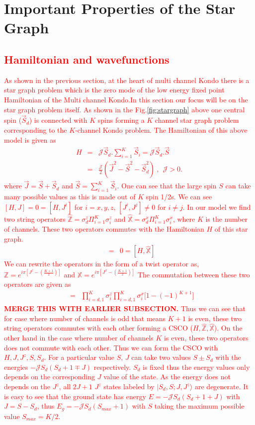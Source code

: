 \documentclass[reprint,prb,superscriptaddress]{revtex4-2}
\begin{document}
\section{Important Properties of the Star Graph}
\textcolor{red}{\subsection{Hamiltonian and wavefunctions}
\noindent As shown in the previous section, at the heart of multi channel Kondo there is a star graph problem which is the zero mode of the low energy fixed point Hamiltonian of the Multi channel Kondo.In this section our focus will be on the star graph problem itself.
As shown in the Fig.\ref{fig:stargraph} above one central spin ($\vec{S}_d$) is connected with $K$ spins forming a $K$ channel star graph problem corresponding to the $K$-channel Kondo problem. The Hamiltonian of this above model is given as 
\begin{eqnarray}
H &=& {\mathcal{J}} \vec{S}_d.\sum_{i=1}^{K}\vec{S}_i={\mathcal{J}} \vec{S}_d.\vec{S} \nonumber\\
&=& \frac{{\mathcal{J}}}{2} (\vec{J}^2-\vec{S}^2-\vec{S}_d^2)~,~~{\mathcal{J}} >0.
\label{eq:stargraph_hamiltonian}
\end{eqnarray}
where $\vec{J}=\vec{S}+\vec{S}_d$ and $\vec{S}=\sum_{i=1}^{K} \vec{S}_i$. One can see that the large spin $S$ can take many possible values as this is made out of $K$ spin 1/2s. We can see $[H,J]=0=[H,J^i]$ for  $i=x,y,z$, $[J^i,J^j]\neq 0$ for $i\neq j$. In our model we find two string operators $\hat{\mathbb{Z}}=\sigma_d^z\Pi_{i=1}^{K} \sigma_i^z$ and $\hat{\mathbb{X}}=\sigma_d^x\Pi_{i=1}^{K} \sigma_i^x$, where $K$ is the number of channels. These two operators commutes with the Hamiltonian $H$ of this star graph.
\begin{eqnarray}
[H,\hat{\mathbb{Z}}] &=& 0 = [H,\hat{\mathbb{X}}]
\end{eqnarray}
We can rewrite the operators in the form of a twist operator as, $\mathbb{Z}=e^{i\pi [J^z-(\frac{K+1}{2})]}$ and $\mathbb{X}=e^{i\pi [J^x-(\frac{K+1}{2})]}$
The commutation between these two operators are given as
\begin{eqnarray}
[\mathbb{Z},\mathbb{X}] &=& \prod_{i=d,1}^{K} \sigma^z_{i} \prod_{i=d,1}^{K} \sigma^x_{i} \bigg[1-(-1)^{K+1}\bigg]
\end{eqnarray}
\textbf{MERGE THIS WITH EARLIER SUBSECTION.}
Thus we can see that for case where number of channels is odd that means $K+1$ is even, these two string operators commutes with each other forming a CSCO ($H,\hat{\mathbb{Z}},\hat{\mathbb{X}}$). On the other hand in the case where number of channels $K$ is even, these two operators does not commute with each other. Thus we can form the CSCO with $H,J,J^z,S,S_d$. For a particular value $S$, $J$ can take two values $S\pm S_d$ with the energies $-{\mathcal{J}} S_d(S_d+1\mp J)$ respectively. $S_d$ is fixed thus the energy values only depends on the corresponding $J$ value of the state. As the energy does not depends on the $J^z$, all $2J+1$ $J^z$ states labeled by $|S_d,S;J,J^z\rangle$ are degenerate. It is easy to see that the ground state has energy $E=-{\mathcal{J}} S_d(S_d+1+J)$ with  $J=S-S_d$, thus $E_g=-{\mathcal{J}} S_d(S_{max}+1)$ with $S$ taking the maximum possible value $S_{max}=K/2$.
}
\end{document}
